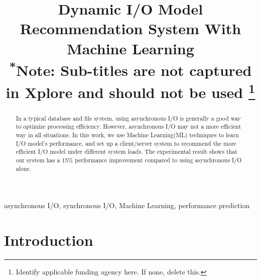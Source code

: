 \documentclass[conference]{IEEEtran}
\begin{document}
\title{Dynamic I/O Model Recommendation System With Machine Learning\\
{\footnotesize \textsuperscript{*}Note: Sub-titles are not captured in Xplore and
should not be used}
\thanks{Identify applicable funding agency here. If none, delete this.}
}

\author{
    \and
}

\maketitle

\begin{abstract}
    In a typical database and file system, using asynchronous I/O is generally a good way to optimize processing efficiency.
    However, asynchronous I/O may not a more efficient way in all situations.
    In this work, we use Machine Learning(ML) techniques to learn I/O model's performance, and set up a client/server system to recommend the more efficient I/O model under different system loads.
    The experimental result shows that our system has a 15\% performance improvement compared to using asynchronous I/O alone.

\end{abstract}

\renewcommand\IEEEkeywordsname{Keywords}
\begin{IEEEkeywords}
    asynchronous I/O, synchronous I/O, Machine Learning, performance prediction
\end{IEEEkeywords}

\section{Introduction}

    
\end{document}
